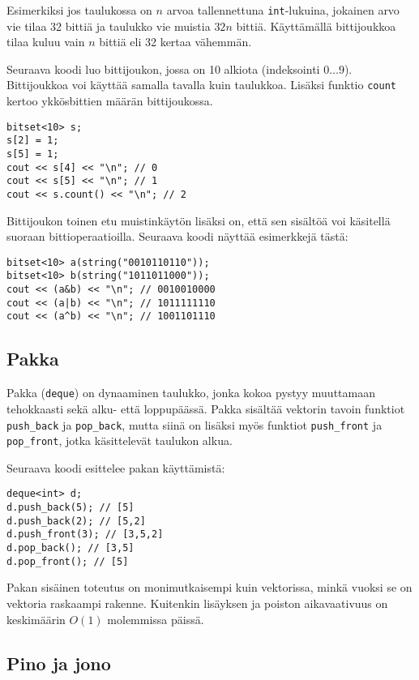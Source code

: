 Esimerkiksi jos taulukossa on $n$ arvoa
tallennettuna \texttt{int}-lukuina,
jokainen arvo vie tilaa 32 bittiä ja taulukko
vie muistia $32n$ bittiä.
Käyttämällä bittijoukkoa tilaa
kuluu vain $n$ bittiä eli 32 kertaa vähemmän.

Seuraava koodi luo bittijoukon, jossa on 10 alkiota
(indeksointi $0 \ldots 9$).
Bittijoukkoa voi käyttää samalla tavalla kuin taulukkoa.
Lisäksi funktio \texttt{count} kertoo ykkösbittien
määrän bittijoukossa.
\begin{lstlisting}
bitset<10> s;
s[2] = 1;
s[5] = 1;
cout << s[4] << "\n"; // 0
cout << s[5] << "\n"; // 1
cout << s.count() << "\n"; // 2
\end{lstlisting}

Bittijoukon toinen etu muistinkäytön lisäksi on,
että sen sisältöä voi käsitellä suoraan bittioperaatioilla.
Seuraava koodi näyttää esimerkkejä tästä:

\begin{lstlisting}
bitset<10> a(string("0010110110"));
bitset<10> b(string("1011011000"));
cout << (a&b) << "\n"; // 0010010000
cout << (a|b) << "\n"; // 1011111110
cout << (a^b) << "\n"; // 1001101110
\end{lstlisting}

\subsection{Pakka}

Pakka (\texttt{deque}) on dynaaminen taulukko,
jonka kokoa pystyy muuttamaan tehokkaasti
sekä alku- että loppupäässä.
Pakka sisältää vektorin tavoin
funktiot \texttt{push\_back}
ja \texttt{pop\_back}, mutta siinä on lisäksi myös funktiot
\texttt{push\_front} ja \texttt{pop\_front},
jotka käsittelevät taulukon alkua.

Seuraava koodi esittelee pakan käyttämistä:

\begin{lstlisting}
deque<int> d;
d.push_back(5); // [5]
d.push_back(2); // [5,2]
d.push_front(3); // [3,5,2]
d.pop_back(); // [3,5]
d.pop_front(); // [5]
\end{lstlisting}

Pakan sisäinen toteutus on monimutkaisempi kuin
vektorissa, minkä vuoksi se on
vektoria raskaampi rakenne.
Kuitenkin lisäyksen ja poiston
aikavaativuus on keskimäärin $O(1)$ molemmissa päissä.

\subsection{Pino ja jono}

